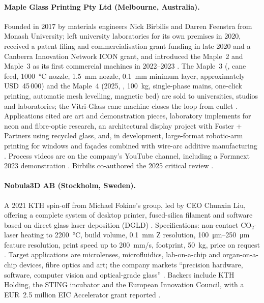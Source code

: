 \paragraph{Maple Glass Printing Pty Ltd (Melbourne, Australia).} Founded in 2017 by materials engineers Nick Birbilis and Darren Feenstra from Monash University; left university laboratories for its own premises in 2020, received a patent filing and commercialisation grant funding in late 2020 and a Canberra Innovation Network ICON grant, and introduced the Maple~2 and Maple~3 as its first commercial machines in 2022--2023 \citep{monash_maple,maple_ammedia,maple_aniwaa}. The Maple~3 (, cane feed, \SI{1000}{\celsius} nozzle, \SI{1.5}{mm} nozzle, \SI{0.1}{mm} minimum layer, approximately USD~45\,000) and the Maple~4 (2025, , \SI{100}{kg}, single-phase mains, one-click printing, automatic mesh levelling, magnetic bed) are sold to universities, studios and laboratories; the Vitri-Glass cane machine closes the loop from cullet \citep{maple_ammedia,threednatives2025,maple_web}. Applications cited are art and demonstration pieces, laboratory implements for neon and fibre-optic research, an architectural display project with Foster + Partners using recycled glass, and, in development, large-format robotic-arm printing for windows and fa\c{c}ades combined with wire-arc additive manufacturing \citep{maple_ammedia}. Process videos are on the company's YouTube channel, including a Formnext 2023 demonstration \citep{maple_youtube}. Birbilis co-authored the 2025 critical review \citep{critical2025}.

\paragraph{Nobula3D AB (Stockholm, Sweden).} A 2021 KTH spin-off from Michael Fokine's group, led by CEO Chunxin Liu, offering a complete system of desktop printer, fused-silica filament and software based on direct glass laser deposition (DGLD) \citep{nobula_kthventures,nobula_fabbaloo}. Specifications: non-contact CO$_2$-laser heating to \SI{2200}{\celsius},  build volume, \SI{0.1}{mm} Z resolution, \SIrange{100}{250}{\micro\metre} feature resolution, print speed up to \SI{200}{mm/s},  footprint, \SI{50}{kg}, price on request \citep{nobula_aniwaa,threednatives2025}. Target applications are microlenses, microfluidics, lab-on-a-chip and organ-on-a-chip devices, fibre optics and art; the company markets ``precision hardware, software, computer vision and optical-grade glass'' \citep{nobula_web}. Backers include KTH Holding, the STING incubator and the European Innovation Council, with a EUR~2.5 million EIC Accelerator grant reported \citep{nobula_kthventures}.


